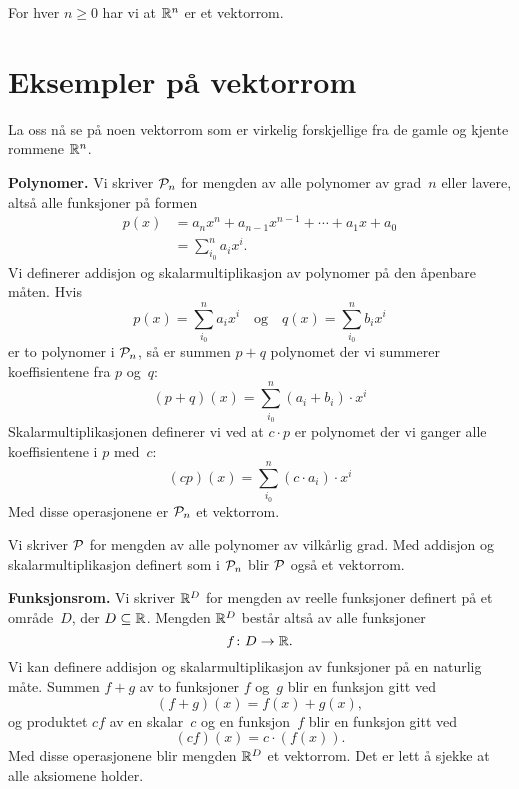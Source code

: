 
\begin{ex}
For hver $n \ge 0$ har vi at $\R^n$ er et vektorrom.
\end{ex}


\section*{Eksempler på vektorrom}

La oss nå se på noen vektorrom som er virkelig forskjellige fra de
gamle og kjente rommene $\R^n$.

\medskip\noindent\textbf{Polynomer. }%
Vi skriver $\P_n$ for mengden av alle polynomer av grad~$n$ eller
lavere, altså alle funksjoner på formen
\begin{align*}
p(x)
&= a_n x^n + a_{n-1} x^{n-1} + \cdots + a_1 x + a_0 \\
&= \sum_{i_0}^n a_i x^i.
\end{align*}
Vi definerer addisjon og skalarmultiplikasjon av polynomer på den
åpenbare måten.  Hvis
\[
p(x) = \sum_{i_0}^n a_i x^i
\quad\text{og}\quad
q(x) = \sum_{i_0}^n b_i x^i
\]
er to polynomer i $\P_n$, så er summen $p + q$ polynomet der vi
summerer koeffisientene fra $p$ og~$q$:
\[
(p + q)(x) = \sum_{i_0}^n (a_i + b_i) \cdot x^i
\]
Skalarmultiplikasjonen definerer vi ved at $c \cdot p$ er polynomet
der vi ganger alle koeffisientene i $p$ med~$c$:
\[
(cp)(x) = \sum_{i_0}^n (c \cdot a_i) \cdot x^i
\]
Med disse operasjonene er $\P_n$ et vektorrom.

Vi skriver $\P$ for mengden av alle polynomer av vilkårlig grad.  Med
addisjon og skalarmultiplikasjon definert som i $\P_n$ blir $\P$ også
et vektorrom.

\medskip\noindent\textbf{Funksjonsrom. }%
Vi skriver $\R^D$ for mengden av reelle funksjoner definert på et
område~$D$, der $D \subseteq \R$.  Mengden $\R^D$ består altså av
alle funksjoner
\[
f \colon D \to \R.
\]
Vi kan definere addisjon og skalarmultiplikasjon av funksjoner på en
naturlig måte.  Summen $f + g$ av to funksjoner $f$ og~$g$ blir en
funksjon gitt ved
\[
(f + g)(x) = f(x) + g(x),
\]
og produktet $cf$ av en skalar~$c$ og en funksjon~$f$ blir en funksjon
gitt ved
\[
(cf)(x) = c \cdot (f(x)).
\]
Med disse operasjonene blir mengden $\R^D$ et vektorrom.
Det er lett å sjekke at alle aksiomene holder.  %

